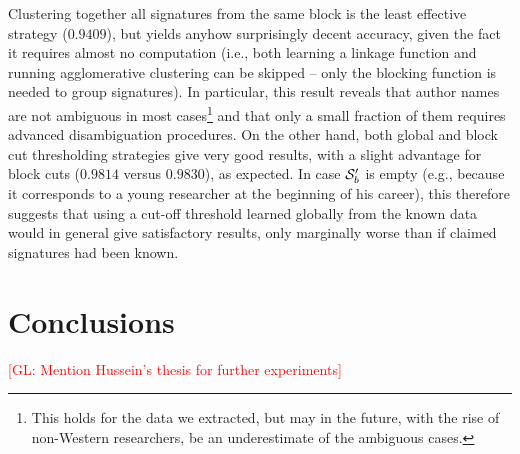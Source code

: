 \documentclass{article}
\newcommand{\glnote}[1]{\textcolor{red}{[GL: #1]}}
\begin{document}
Clustering together all signatures from the same block is the least effective
strategy ($0.9409$), but yields anyhow surprisingly decent accuracy, given the
fact it requires almost no computation (i.e., both learning a linkage function
and running agglomerative clustering can be skipped -- only the blocking
function is needed to group signatures). In particular, this result reveals
that author names are not ambiguous in most cases\footnote{This holds for the
data we extracted, but may in the future, with the rise of non-Western
researchers, be an underestimate of the ambiguous cases.} and that only a small
fraction of them requires advanced disambiguation procedures. On the other
hand, both global and block cut thresholding strategies give very good results,
with a slight advantage for block cuts ($0.9814$ versus $0.9830$), as expected.
In case ${\cal S}^\prime_b$ is empty (e.g., because it corresponds to a young
researcher at the beginning of his career), this therefore suggests that using
a cut-off threshold learned globally from the known data would in general give
satisfactory results, only marginally worse than if claimed signatures had been
known.



\section{Conclusions}
\label{conclusions}



\glnote{Mention Hussein's thesis for further experiments}





\end{document}
